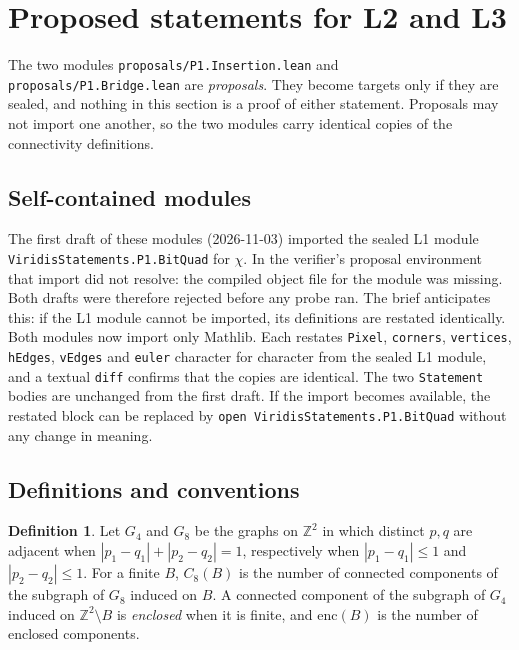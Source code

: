 \documentclass[11pt]{article}
\theoremstyle{definition}
\newtheorem{definition}[theorem]{Definition}
\theoremstyle{remark}
\begin{document}
\section{Proposed statements for L2 and L3}\label{sec:proposals}

The two modules \texttt{proposals/P1.Insertion.lean} and
\texttt{proposals/P1.Bridge.lean} are \emph{proposals}. They become targets only
if they are sealed, and nothing in this section is a proof of either statement.
Proposals may not import one another, so the two modules carry identical copies
of the connectivity definitions.

\subsection{Self-contained modules}\label{sec:selfcontained}
{\sloppy The first draft of these modules (2026-11-03) imported the sealed L1 module
\texttt{ViridisStatements.P1.BitQuad} for $\chi$. In the verifier's proposal
environment that import did not resolve: the compiled object file for the module
was missing. Both drafts were therefore rejected before any probe ran. The brief
anticipates this: if the L1 module cannot be imported, its definitions are
restated identically. Both modules now import only Mathlib. Each restates
\texttt{Pixel}, \texttt{corners}, \texttt{vertices}, \texttt{hEdges},
\texttt{vEdges} and \texttt{euler} character for character from the sealed L1
module, and a textual \texttt{diff} confirms that the copies are identical. The
two \texttt{Statement} bodies are unchanged from the first draft. If the import
becomes available, the restated block can be replaced by
\texttt{open ViridisStatements.P1.BitQuad} without any change in meaning.\par}

\subsection{Definitions and conventions}

\begin{definition}
Let $G_4$ and $G_8$ be the graphs on $\mathbb{Z}^2$ in which distinct $p,q$ are
adjacent when $|p_1-q_1|+|p_2-q_2|=1$, respectively when $|p_1-q_1|\le1$ and
$|p_2-q_2|\le1$. For a finite $B$, $C_8(B)$ is the number of connected
components of the subgraph of $G_8$ induced on $B$. A connected component of the
subgraph of $G_4$ induced on $\mathbb{Z}^2\setminus B$ is \emph{enclosed} when it
is finite, and $\mathrm{enc}(B)$ is the number of enclosed components.
\end{definition}
\end{document}
